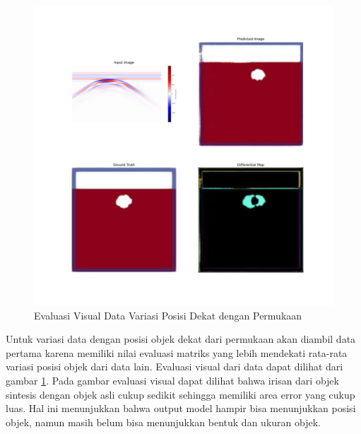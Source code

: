 \begin{figure}[ht]
  \centering
  \includegraphics[scale=0.15]{gambar/diffMapDangkal.jpg}
  \caption{Evaluasi Visual Data Variasi Posisi Dekat dengan Permukaan}
  \label{fig:diffmapdangkal}
\end{figure}

Untuk variasi data dengan posisi objek dekat dari permukaan akan diambil data pertama karena memiliki nilai evaluasi matriks yang lebih mendekati rata-rata variasi posisi objek dari data lain. 
Evaluasi visual dari data dapat dilihat dari gambar \ref{fig:diffmapdangkal}. 
Pada gambar evaluasi visual dapat dilihat bahwa irisan dari objek sintesis dengan objek asli cukup sedikit sehingga memiliki area error yang cukup luas. 
Hal ini menunjukkan bahwa output model hampir bisa menunjukkan posisi objek, namun masih belum bisa menunjukkan bentuk dan ukuran objek.

